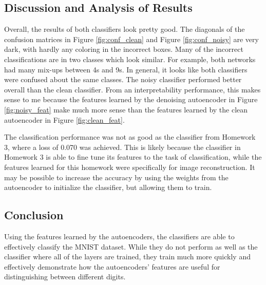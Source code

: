 \documentclass[a4paper, 12pt, titlepage]{article}
\newcommand{\figRef}[1]{Figure \ref{#1}}
\begin{document}
  \subsection{Discussion and Analysis of Results}
  \par Overall, the results of both classifiers look pretty good.
  The diagonals of the confusion matrices in \figRef{fig:conf_clean} and
  \figRef{fig:conf_noisy} are very dark, with hardly any coloring in the
  incorrect boxes.
  Many of the incorrect classifications are in two classes which look similar.
  For example, both networks had many mix-ups between 4s and 9s.
  In general, it looks like both classifiers were confused about the same
  classes.
  The noisy classifier performed better overall than the clean classifier.
  From an interpretability performance, this makes sense to me because the
  features learned by the denoising autoencoder in \figRef{fig:noisy_feat} make
  much more sense than the features learned by the clean autoencoder in
  \figRef{fig:clean_feat}.
  \par The classification performance was not as good as the classifier from
  Homework 3, where a loss of 0.070 was achieved.
  This is likely because the classifier in Homework 3 is able to fine tune its
  features to the task of classification, while the features learned for this
  homework were specifically for image reconstruction.
  It may be possible to increase the accuracy by using the weights from the
  autoencoder to initialize the classifier, but allowing them to train.

  \subsection{Conclusion}
  \par Using the features learned by the autoencoders, the classifiers are able
  to effectively classify the MNIST dataset.
  While they do not perform as well as the classifier where all of the layers
  are trained, they train much more quickly and effectively demonstrate how the
  autoencoders' features are useful for distinguishing between different
  digits.
\end{document}
